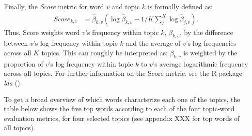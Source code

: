 Finally, the \textit{Score} metric for word $v$ and topic $k$ is formally defined as:
\begin{align*}
Score_{k,v} &= \hat{\beta}_{k,v}(\log\hat{\beta}_{k,v} - 1/K\sum_{j}^{K}\log\hat{\beta}_{j,v}).
\end{align*}
Thus, Score weights word $v$'s frequency within topic $k$, $\beta_{k,v}$, by the difference between $v$'s log frequency within topic $k$ and the average of $v$'s log frequencies across all $K$ topics. This can roughly be interpreted as: $\beta_{k,v}$ is weighted by the proportion of $v$'s log frequency within topic $k$ to $v$'s average logarithmic frequency across all topics. For further information on the Score metric, see the R package \textit{lda} (\citealp{chang2010package}).

To get a broad overview of which words characterize each one of the topics, the table below shows the five top words according to each of the four topic-word evaluation metrics, for four selected topics (see appendix XXX for top words of all topics).

